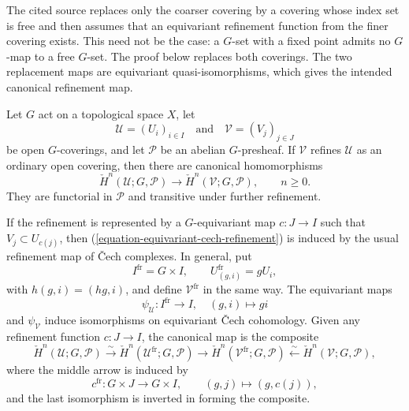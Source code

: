 \begin{lemma}
\label{lemma-equivariant-cech-refinements}
\begin{reference}
\cite[Chapter V, \S 5.5, (5.5.12), pp. 211--212]{Tohoku}
\end{reference}
\begin{history}
The cited source replaces only the coarser covering by a covering whose
index set is free and then assumes that an equivariant refinement function
from the finer covering exists. This need not be the case: a $G$-set with a
fixed point admits no $G$-map to a free $G$-set. The proof below replaces
both coverings. The two replacement maps are equivariant
quasi-isomorphisms, which gives the intended canonical refinement map.
\end{history}
Let $G$ act on a topological space $X$, let
$$
\mathcal{U}=(U_i)_{i\in I}
\quad\text{and}\quad
\mathcal{V}=(V_j)_{j\in J}
$$
be open $G$-coverings, and let $\mathcal{P}$ be an abelian
$G$-presheaf. If $\mathcal{V}$ refines $\mathcal{U}$ as an ordinary
open covering, then there are canonical homomorphisms
\begin{equation}
\label{equation-equivariant-cech-refinement}
\check H^n(\mathcal{U};G,\mathcal{P})
\longrightarrow
\check H^n(\mathcal{V};G,\mathcal{P}),
\qquad n\geq 0.
\end{equation}
They are functorial in $\mathcal{P}$ and transitive under further
refinement.

If the refinement is represented by a $G$-equivariant map
$c:J\to I$ such that $V_j\subset U_{c(j)}$, then
(\ref{equation-equivariant-cech-refinement}) is induced by the usual
refinement map of \v Cech complexes. In general, put
$$
I^{\mathrm{fr}}=G\times I,
\qquad
U^{\mathrm{fr}}_{(g,i)}=gU_i,
$$
with $h(g,i)=(hg,i)$, and define $\mathcal{V}^{\mathrm{fr}}$ in the
same way. The equivariant maps
$$
\psi_{\mathcal U}:I^{\mathrm{fr}}\longrightarrow I,
\quad (g,i)\longmapsto gi
$$
and $\psi_{\mathcal V}$ induce isomorphisms on equivariant \v Cech
cohomology. Given any refinement function $c:J\to I$, the canonical map
is the composite
$$
\check H^n(\mathcal U;G,\mathcal P)
\xrightarrow{\sim}
\check H^n(\mathcal U^{\mathrm{fr}};G,\mathcal P)
\longrightarrow
\check H^n(\mathcal V^{\mathrm{fr}};G,\mathcal P)
\xleftarrow{\sim}
\check H^n(\mathcal V;G,\mathcal P),
$$
where the middle arrow is induced by
$$
c^{\mathrm{fr}}:G\times J\longrightarrow G\times I,
\qquad (g,j)\longmapsto(g,c(j)),
$$
and the last isomorphism is inverted in forming the composite.
\end{lemma}

